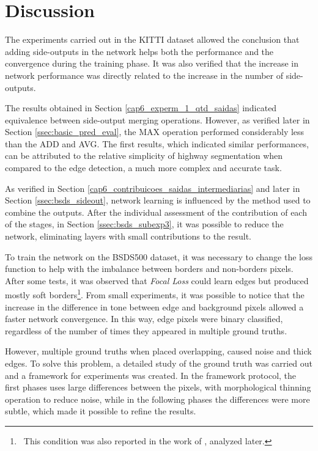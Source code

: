 \section{Discussion}
\label{cap6_discussion}

The experiments carried out in the KITTI dataset allowed the conclusion that adding side-outputs in the network helps both the performance and the convergence during the training phase.
It was also verified that the increase in network performance was directly related to the increase in the number of side-outputs.

The results obtained in Section \ref{cap6_experm_1_qtd_saidas} indicated equivalence between side-output merging operations.
However, as verified later in Section \ref{ssec:basic_pred_eval}, the MAX operation performed considerably less than the ADD and AVG.
The first results, which indicated similar performances, can be attributed to the relative simplicity of highway segmentation when compared to the edge detection, a much more complex and accurate task.

As verified in Section \ref{cap6_contribuicoes_saidas_intermediarias} and later in Section \ref{ssec:bsds_sideout}, network learning is influenced by the method used to combine the outputs.
After the individual assessment of the contribution of each of the stages, in Section \ref{ssec:bsds_subexp3}, it was possible to reduce the network, eliminating layers with small contributions to the result.

To train the network on the BSDS500 dataset, it was necessary to change the loss function to help with the imbalance between borders and non-borders pixels.
After some tests, it was observed that \textit{Focal Loss} could learn edges but produced mostly soft borders\footnote{~This condition was also reported in the work of , analyzed later.}.
From small experiments, it was possible to notice that the increase in the difference in tone between edge and background pixels allowed a faster network convergence.
In this way, edge pixels were binary classified, regardless of the number of times they appeared in multiple ground truths.

However, multiple ground truths when placed overlapping, caused noise and thick edges.
To solve this problem, a detailed study of the ground truth was carried out and a framework for experiments was created.
In the framework protocol, the first phases uses large differences between the pixels, with morphological thinning operation to reduce noise, while in the following phases the differences were more subtle, which made it possible to refine the results.


